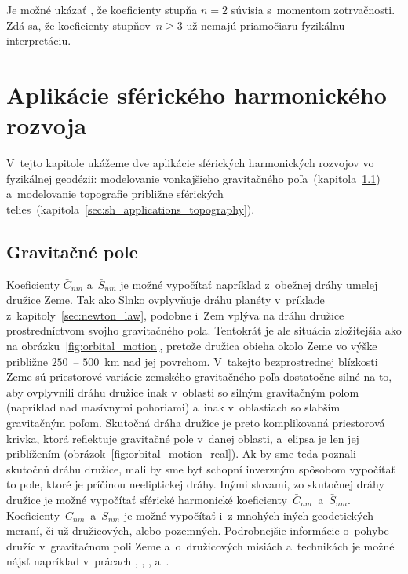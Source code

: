 \documentclass[a4paper, 12pt]{book}
\begin{document}
Je možné ukázať \parencite[napríklad][]{MoritzPhysicalGeodesy}, že koeficienty 
stupňa $n = 2$ súvisia s~momentom zotrvačnosti.  Zdá sa, že koeficienty 
stupňov~$n \geq 3$ už nemajú priamočiaru fyzikálnu interpretáciu.







\section{Aplikácie sférického harmonického rozvoja}
\label{sec:spherical_harmonics_applications}

V~tejto kapitole ukážeme dve aplikácie sférických harmonických rozvojov vo 
fyzikálnej geodézii: modelovanie vonkajšieho gravitačného 
poľa~(kapitola~\ref{sec:sh_applications_gravity_field})
a~modelovanie topografie približne sférických 
telies~(kapitola~\ref{sec:sh_applications_topography}).

\subsection{Gravitačné pole}
\label{sec:sh_applications_gravity_field}

Koeficienty $\bar{C}_{nm}$ a~$\bar{S}_{nm}$ je možné vypočítať napríklad 
z~obežnej dráhy umelej družice Zeme.  Tak ako Slnko ovplyvňuje dráhu planéty 
v~príklade z~kapitoly~\ref{sec:newton_law}, podobne i~Zem vplýva na dráhu 
družice prostredníctvom svojho gravitačného poľa.  Tentokrát je ale situácia 
zložitejšia ako na obrázku~\ref{fig:orbital_motion}, pretože družica obieha 
okolo Zeme vo výške približne $250$~-- $500$~km nad jej povrchom.  V~takejto 
bezprostrednej blízkosti Zeme sú priestorové variácie zemského gravitačného 
poľa dostatočne silné na to, aby ovplyvnili dráhu družice inak v~oblasti so 
silným gravitačným poľom (napríklad nad masívnymi pohoriami) a~inak 
v~oblastiach so slabším gravitačným poľom.  Skutočná dráha družice je preto 
komplikovaná priestorová krivka, ktorá reflektuje gravitačné pole v~danej 
oblasti, a~elipsa je len jej priblížením 
(obrázok~\ref{fig:orbital_motion_real}).  Ak by sme teda poznali skutočnú dráhu 
družice, mali by sme byť schopní inverzným spôsobom vypočítať to pole, ktoré je 
príčinou neeliptickej dráhy.  Inými slovami, zo skutočnej dráhy družice je 
možné vypočítať sférické harmonické 
koeficienty~$\bar{C}_{nm}$~a~$\bar{S}_{nm}$.  
Koeficienty~$\bar{C}_{nm}$~a~$\bar{S}_{nm}$ je možné vypočítať i~z mnohých 
iných geodetických meraní, či už družicových, alebo pozemných.  Podrobnejšie 
informácie o~pohybe družíc v~gravitačnom poli Zeme a~o~družicových misiách 
a~technikách je možné nájsť napríklad v~prácach 
\textcite{SeeberSatelliteGeodesy}, \textcite{MoritzPhysicalGeodesy}, 
\textcite{Kostelecky2008}, \textcite{Melicher2009} a~\textcite{Husar2017}.
\end{document}
